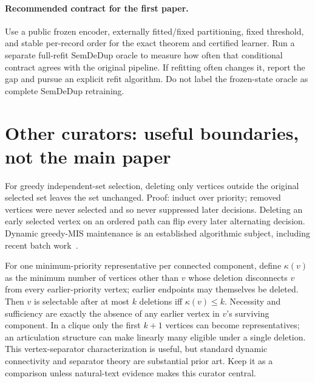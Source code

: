 \documentclass[11pt,a4paper]{article}
\theoremstyle{definition}\newtheorem{definition}[theorem]{Definition}
\begin{document}
\paragraph{Recommended contract for the first paper.} Use a public frozen encoder, externally fitted/fixed partitioning, fixed threshold, and stable per-record order for the exact theorem and certified learner. Run a separate full-refit SemDeDup oracle to measure how often that conditional contract agrees with the original pipeline. If refitting often changes it, report the gap and pursue an explicit refit algorithm. Do not label the frozen-state oracle as complete SemDeDup retraining.

\section{Other curators: useful boundaries, not the main paper}
For greedy independent-set selection, deleting only vertices outside the original selected set leaves the set unchanged. Proof: induct over priority; removed vertices were never selected and so never suppressed later decisions. Deleting an early selected vertex on an ordered path can flip every later alternating decision. Dynamic greedy-MIS maintenance is an established algorithmic subject, including recent batch work~\cite{assadi2019,dhulipala2026}.

For one minimum-priority representative per connected component, define $\kappa(v)$ as the minimum number of vertices other than $v$ whose deletion disconnects $v$ from every earlier-priority vertex; earlier endpoints may themselves be deleted. Then $v$ is selectable after at most $k$ deletions iff $\kappa(v)\le k$. Necessity and sufficiency are exactly the absence of any earlier vertex in $v$'s surviving component. In a clique only the first $k+1$ vertices can become representatives; an articulation structure can make linearly many eligible under a single deletion. This vertex-separator characterization is useful, but standard dynamic connectivity and separator theory are substantial prior art. Keep it as a comparison unless natural-text evidence makes this curator central.
\end{document}
